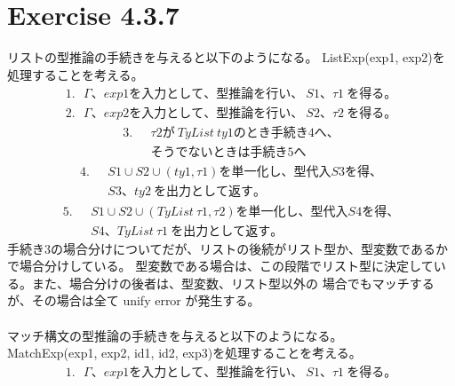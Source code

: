 \documentclass{jreport}
\begin{document}
\section{Exercise 4.3.7}
リストの型推論の手続きを与えると以下のようになる。
ListExp(exp1, exp2)を処理することを考える。
\begin{equation}
  \begin{split}
    1. \ \ \ \Gamma、exp1 を入力として、型推論を行い、\ S1、\tau1 \ を得る。
  \end{split}
\end{equation}
\begin{equation}
  \begin{split}
    2. \ \ \ \Gamma、exp2 を入力として、型推論を行い、\ S2、\tau2 \ を得る。
  \end{split}
\end{equation}
\begin{equation}
  \begin{split}
    3. \ \ \ &\tau2 が \ TyList \ ty1　のとき手続き4へ、
    \\ & そうでないときは手続き5へ
  \end{split}
\end{equation}
\begin{equation}
  \begin{split}
    4. \ \ \ &S1 \cup S2 \cup (ty1, \tau1) を単一化し、型代入S3を得、\\ &
    S3、ty2 \ を出力として返す。
  \end{split}
\end{equation}
\begin{equation}
  \begin{split}
    5. \ \ \ &S1 \cup S2 \cup (TyList \ \tau1, \tau2) を単一化し、型代入S4を得、\\ &
    S4、TyList \ \tau1 \ を出力として返す。
  \end{split}
\end{equation}
手続き3の場合分けについてだが、リストの後続がリスト型か、型変数であるかで場合分けしている。
型変数である場合は、この段階でリスト型に決定している。また、場合分けの後者は、型変数、リスト型以外の
場合でもマッチするが、その場合は全て unify error が発生する。
\\
\\
マッチ構文の型推論の手続きを与えると以下のようになる。\\
MatchExp(exp1, exp2, id1, id2, exp3)を処理することを考える。
\begin{equation}
  \begin{split}
    1. \ \ \ \Gamma、exp1 を入力として、型推論を行い、\ S1、\tau1 \ を得る。
  \end{split}
\end{equation}
\end{document}
